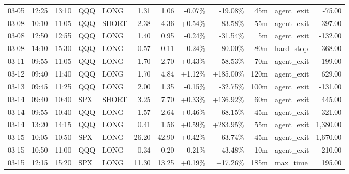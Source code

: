 \documentclass[11pt,a4paper,twoside]{article}
\begin{document}
\begin{center}
\begin{longtable}{>{\color{txtmain}}l l l l l r r r r r >{\color{txtmain}}l r}
03-05 & 12:25 & 13:10 & QQQ & LONG & 1.31 & 1.06 & \textcolor{lossred}{-0.07\%} & \textcolor{lossred}{-19.08\%} & 45m & agent\_exit & \textcolor{lossred}{-75.00} \\
03-08 & 10:10 & 11:05 & QQQ & SHORT & 2.38 & 4.36 & \textcolor{wingreen}{+0.54\%} & \textcolor{wingreen}{+83.58\%} & 55m & agent\_exit & \textcolor{wingreen}{397.00} \\
03-08 & 12:50 & 12:55 & QQQ & LONG & 1.40 & 0.95 & \textcolor{lossred}{-0.24\%} & \textcolor{lossred}{-31.54\%} & 5m & agent\_exit & \textcolor{lossred}{-132.00} \\
03-08 & 14:10 & 15:30 & QQQ & LONG & 0.57 & 0.11 & \textcolor{lossred}{-0.24\%} & \textcolor{lossred}{-80.00\%} & 80m & hard\_stop & \textcolor{lossred}{-368.00} \\
03-11 & 09:55 & 11:05 & QQQ & LONG & 1.70 & 2.70 & \textcolor{wingreen}{+0.43\%} & \textcolor{wingreen}{+58.53\%} & 70m & agent\_exit & \textcolor{wingreen}{199.00} \\
03-12 & 09:40 & 11:40 & QQQ & LONG & 1.70 & 4.84 & \textcolor{wingreen}{+1.12\%} & \textcolor{wingreen}{+185.00\%} & 120m & agent\_exit & \textcolor{wingreen}{629.00} \\
03-13 & 09:45 & 11:25 & QQQ & LONG & 2.00 & 1.35 & \textcolor{lossred}{-0.15\%} & \textcolor{lossred}{-32.75\%} & 100m & agent\_exit & \textcolor{lossred}{-131.00} \\
03-14 & 09:40 & 10:40 & SPX & SHORT & 3.25 & 7.70 & \textcolor{wingreen}{+0.33\%} & \textcolor{wingreen}{+136.92\%} & 60m & agent\_exit & \textcolor{wingreen}{445.00} \\
03-14 & 09:55 & 10:40 & QQQ & LONG & 1.57 & 2.64 & \textcolor{wingreen}{+0.46\%} & \textcolor{wingreen}{+68.15\%} & 45m & agent\_exit & \textcolor{wingreen}{321.00} \\
03-14 & 13:20 & 14:15 & QQQ & LONG & 0.41 & 1.56 & \textcolor{wingreen}{+0.59\%} & \textcolor{wingreen}{+283.95\%} & 55m & agent\_exit & \textcolor{wingreen}{1,380.00} \\
03-15 & 10:05 & 10:50 & SPX & LONG & 26.20 & 42.90 & \textcolor{wingreen}{+0.42\%} & \textcolor{wingreen}{+63.74\%} & 45m & agent\_exit & \textcolor{wingreen}{1,670.00} \\
03-15 & 10:50 & 11:00 & QQQ & LONG & 0.34 & 0.20 & \textcolor{lossred}{-0.21\%} & \textcolor{lossred}{-43.48\%} & 10m & agent\_exit & \textcolor{lossred}{-210.00} \\
03-15 & 12:15 & 15:20 & SPX & LONG & 11.30 & 13.25 & \textcolor{wingreen}{+0.19\%} & \textcolor{wingreen}{+17.26\%} & 185m & max\_time & \textcolor{wingreen}{195.00} \\

\end{longtable}
\end{center}
\end{document}

